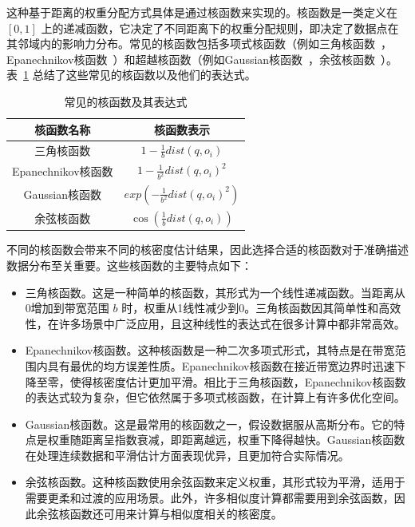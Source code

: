 这种基于距离的权重分配方式具体是通过核函数来实现的。核函数是一类定义在 $[0, 1]$ 上的递减函数，它决定了不同距离下的权重分配规则，即决定了数据点在其邻域内的影响力分布。常见的核函数包括多项式核函数（例如三角核函数~\cite{fleuret_scale-invariance_2003, gong_estimating_2014}，Epanechnikov核函数~\cite{samiuddin_nonparametric_1990, bil_identification_2013}）和超越核函数（例如Gaussian核函数~\cite{scholkopf_comparing_1997, kristan_multivariate_2011}，余弦核函数~\cite{de_felice_short-term_2015}）。表~\ref{tab1} 总结了这些常见的核函数以及他们的表达式。

\begin{table}[!h]
	\centering
	\def\arraystretch{1.5}
	\caption{常见的核函数及其表达式}
	\label{tab1}
	\begin{tabular}{c|c}
		\hline
		核函数名称       & 核函数表示                                             \\ \hline \hline
		三角核函数 \cite{fleuret_scale-invariance_2003, gong_estimating_2014}   & $1-\frac{1}{b}dist(q,o_i)$         \\ 
		Epanechnikov核函数 \cite{samiuddin_nonparametric_1990, bil_identification_2013} & $1-\frac{1}{b^2}dist(q,o_i)^2$     \\ 
		Gaussian核函数 \cite{scholkopf_comparing_1997, kristan_multivariate_2011}     & $exp(-\frac{1}{b^2}dist(q,o_i)^2)$ \\ 
		余弦核函数 \cite{de_felice_short-term_2015}       & $\cos(\frac{1}{b}dist(q,o_i))$     \\ \hline
	\end{tabular}
\end{table}

不同的核函数会带来不同的核密度估计结果，因此选择合适的核函数对于准确描述数据分布至关重要。这些核函数的主要特点如下：
\begin{itemize}
	\item 三角核函数。这是一种简单的核函数，其形式为一个线性递减函数。当距离从0增加到带宽范围 $b$ 时，权重从1线性减少到0。三角核函数因其简单性和高效性，在许多场景中广泛应用，且这种线性的表达式在很多计算中都非常高效。
	\item Epanechnikov核函数。这种核函数是一种二次多项式形式，其特点是在带宽范围内具有最优的均方误差性质。Epanechnikov核函数在接近带宽边界时迅速下降至零，使得核密度估计更加平滑。相比于三角核函数，Epanechnikov核函数的表达式较为复杂，但它依然属于多项式核函数，在计算上有许多优化空间。
	\item Gaussian核函数。这是最常用的核函数之一，假设数据服从高斯分布。它的特点是权重随距离呈指数衰减，即距离越远，权重下降得越快。Gaussian核函数在处理连续数据和平滑估计方面表现优异，且更加符合实际情况。
	\item 余弦核函数。这种核函数使用余弦函数来定义权重，其形式较为平滑，适用于需要更柔和过渡的应用场景。此外，许多相似度计算都需要用到余弦函数，因此余弦核函数还可用来计算与相似度相关的核密度。
\end{itemize}

